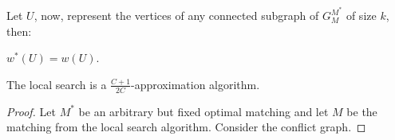 Let $U$, now, represent the vertices of any connected subgraph of $G^{M^*}_M$
of size $k$, then:

\begin{observation}
$w^*(U) = w(U)$.
\end{observation}




\begin{theorem}
The local search is a $\frac{C + 1}{2C}$-approximation algorithm.
\end{theorem}

\begin{proof}
Let $M^*$ be an arbitrary but fixed optimal matching and let $M$ be the matching from the 
local search algorithm.
Consider the conflict graph.
\end{proof}


